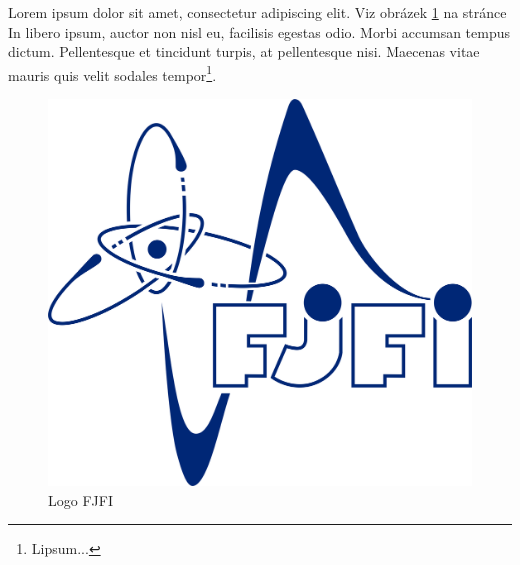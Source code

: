 \documentclass{report}
\begin{document}
Lorem ipsum dolor sit amet, consectetur adipiscing elit. Viz obrázek \ref{fig:logo} na stránce \pageref{fig:logo} In libero ipsum, auctor non nisl eu, facilisis egestas odio. Morbi accumsan tempus dictum. Pellentesque et tincidunt turpis, at pellentesque nisi. Maecenas vitae mauris quis velit sodales tempor\footnote{Lipsum...}.

\begin{figure}[!htp]
	\begin{center}
		\includegraphics[scale=0.1]{logo-fjfi.png}
	\end{center}
	\caption{Logo FJFI}
	\label{fig:logo}
\end{figure}

\clearpage

\listoffigures
\end{document}
